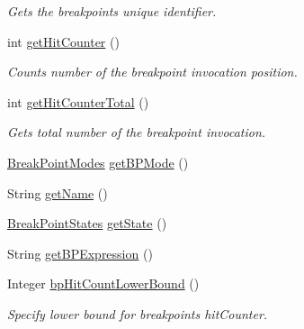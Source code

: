 \begin{DoxyCompactItemize}
\begin{DoxyCompactList}\small\item\em Gets the breakpoint\textquotesingle{}s unique identifier. \end{DoxyCompactList}\item 
int \hyperlink{classgov_1_1nasa_1_1jpf_1_1inspector_1_1server_1_1breakpoints_1_1_break_point_status_impl_abf2690a7a2f643395df19c28acd2dba2}{get\+Hit\+Counter} ()
\begin{DoxyCompactList}\small\item\em Counts number of the breakpoint invocation position. \end{DoxyCompactList}\item 
int \hyperlink{classgov_1_1nasa_1_1jpf_1_1inspector_1_1server_1_1breakpoints_1_1_break_point_status_impl_adadeb33c3d6f89cba5485bc2b89a7060}{get\+Hit\+Counter\+Total} ()
\begin{DoxyCompactList}\small\item\em Gets total number of the breakpoint invocation. \end{DoxyCompactList}\item 
\hyperlink{enumgov_1_1nasa_1_1jpf_1_1inspector_1_1server_1_1breakpoints_1_1_break_point_modes}{Break\+Point\+Modes} \hyperlink{classgov_1_1nasa_1_1jpf_1_1inspector_1_1server_1_1breakpoints_1_1_break_point_status_impl_a3810525395b6ebf901b9c45fc5c6bd3a}{get\+B\+P\+Mode} ()
\item 
String \hyperlink{classgov_1_1nasa_1_1jpf_1_1inspector_1_1server_1_1breakpoints_1_1_break_point_status_impl_a7d69cad483a1ac9dc02e4f4459ec2a6d}{get\+Name} ()
\item 
\hyperlink{enumgov_1_1nasa_1_1jpf_1_1inspector_1_1interfaces_1_1_break_point_states}{Break\+Point\+States} \hyperlink{classgov_1_1nasa_1_1jpf_1_1inspector_1_1server_1_1breakpoints_1_1_break_point_status_impl_a7c48557c379be25a094fac839a9128b4}{get\+State} ()
\item 
String \hyperlink{classgov_1_1nasa_1_1jpf_1_1inspector_1_1server_1_1breakpoints_1_1_break_point_status_impl_a2c106060493596a61ce4cf28cc3f4e8f}{get\+B\+P\+Expression} ()
\item 
Integer \hyperlink{classgov_1_1nasa_1_1jpf_1_1inspector_1_1server_1_1breakpoints_1_1_break_point_status_impl_a50d8d5bd12ae0e575edd46ae3160e95d}{bp\+Hit\+Count\+Lower\+Bound} ()
\begin{DoxyCompactList}\small\item\em Specify lower bound for breakpoint\textquotesingle{}s hit\+Counter. \end{DoxyCompactList}\item 

\end{DoxyCompactItemize}
